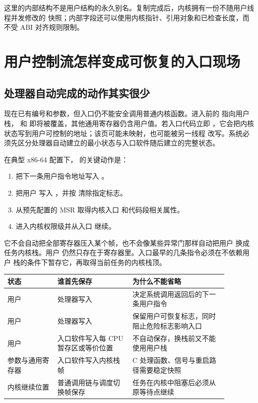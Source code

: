 这里的内部结构不是用户结构的永久别名。复制完成后，内核拥有一份不随用户线程并发修改的
快照；内部字段还可以使用内核指针、引用对象和已检查长度，而不受 ABI 对齐规则限制。

\section{用户控制流怎样变成可恢复的入口现场}

\subsection{处理器自动完成的动作其实很少}

现在已有编号和参数，但入口仍不能安全调用普通内核函数。进入前的  指向用户
栈， 和  即将被覆盖，其他通用寄存器仍含用户值。若入口代码立即
，它会把内核状态写到用户可控制的地址；该页可能未映射，也可能被另一线程
改写。系统必须先区分处理器自动建立的最小状态与入口软件随后建立的完整状态。

在典型 x86-64 配置下， 的关键动作是：

\begin{enumerate}
\tightlist
\item 把下一条用户指令地址写入 。
\item 把用户  写入 ，并按  清除指定标志。
\item 从预先配置的 MSR 取得内核入口  和代码段相关属性。
\item 进入内核权限级并从入口  继续。
\end{enumerate}

它不会自动把全部寄存器压入某个帧，也不会像某些异常门那样自动把用户  换成
任务内核栈。用户  仍然只存在于寄存器里。入口最早的几条指令必须在不依赖用户
栈的条件下暂存它，再取得当前任务的内核栈顶。

\begin{longtable}{|L{0.20\linewidth}|L{0.30\linewidth}|L{0.38\linewidth}|}
\hline
状态 & 谁首先保存 & 为什么不能省略 \\ \hline
用户  & 处理器写入  & 决定系统调用返回后的下一条用户指令 \\ \hline
用户  & 处理器写入  & 保留用户可恢复标志，同时阻止危险标志影响入口 \\ \hline
用户  & 入口软件写入每 CPU 暂存区或等价位置 &  不自动保存，换栈前又不能使用用户栈 \\ \hline
参数与通用寄存器 & 入口软件写入内核栈帧 & C 处理函数、信号与重启路径需要稳定快照 \\ \hline
内核继续位置 & 普通调用链与调度切换帧保存 & 任务在内核中阻塞后必须从原等待点继续 \\ \hline
\end{longtable}

